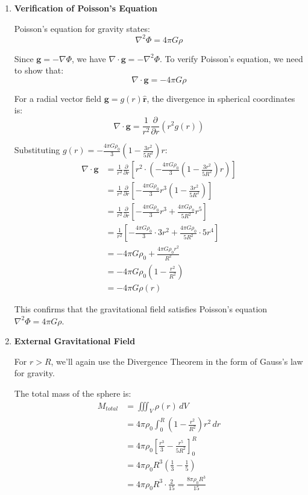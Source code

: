 \begin{example}
\begin{solution}
\begin{enumerate}
    \item \textbf{Verification of Poisson's Equation}
    
    Poisson's equation for gravity states:
    \[
    \nabla^2\Phi = 4\pi G\rho
    \]
    
    Since $\mathbf{g} = -\nabla\Phi$, we have $\nabla \cdot \mathbf{g} = -\nabla^2\Phi$. To verify Poisson's equation, we need to show that:
    \[
    \nabla \cdot \mathbf{g} = -4\pi G\rho
    \]
    
    For a radial vector field $\mathbf{g} = g(r)\hat{\mathbf{r}}$, the divergence in spherical coordinates is:
    \[
    \nabla \cdot \mathbf{g} = \frac{1}{r^2}\frac{\partial}{\partial r}(r^2 g(r))
    \]
    
    Substituting $g(r) = -\frac{4\pi G\rho_0}{3}\left(1 - \frac{3r^2}{5R^2}\right)r$:
    \[
    \begin{aligned}
    \nabla \cdot \mathbf{g} &= \frac{1}{r^2}\frac{\partial}{\partial r}\left[r^2 \cdot \left(-\frac{4\pi G\rho_0}{3}\left(1 - \frac{3r^2}{5R^2}\right)r\right)\right] \\
    &= \frac{1}{r^2}\frac{\partial}{\partial r}\left[-\frac{4\pi G\rho_0}{3}r^3\left(1 - \frac{3r^2}{5R^2}\right)\right] \\
    &= \frac{1}{r^2}\frac{\partial}{\partial r}\left[-\frac{4\pi G\rho_0}{3}r^3 + \frac{4\pi G\rho_0}{5R^2}r^5\right] \\
    &= \frac{1}{r^2}\left[-\frac{4\pi G\rho_0}{3} \cdot 3r^2 + \frac{4\pi G\rho_0}{5R^2} \cdot 5r^4\right] \\
    &= -4\pi G\rho_0 + \frac{4\pi G\rho_0r^2}{R^2} \\
    &= -4\pi G\rho_0\left(1 - \frac{r^2}{R^2}\right) \\
    &= -4\pi G\rho(r)
    \end{aligned}
    \]
    
    This confirms that the gravitational field satisfies Poisson's equation $\nabla^2\Phi = 4\pi G\rho$.
    
    \item \textbf{External Gravitational Field}
    
    For $r > R$, we'll again use the Divergence Theorem in the form of Gauss's law for gravity.
    
    The total mass of the sphere is:
    \[
    \begin{aligned}
    M_{total} &= \iiint_V \rho(r) \, dV \\
    &= 4\pi\rho_0 \int_0^R \left(1 - \frac{r^2}{R^2}\right)r^2 \, dr \\
    &= 4\pi\rho_0 \left[\frac{r^3}{3} - \frac{r^5}{5R^2}\right]_0^R \\
    &= 4\pi\rho_0R^3 \left(\frac{1}{3} - \frac{1}{5}\right) \\
    &= 4\pi\rho_0R^3 \cdot \frac{2}{15} = \frac{8\pi\rho_0R^3}{15}
    \end{aligned}
    \]
    

\end{enumerate}
\end{solution}
\end{example}
